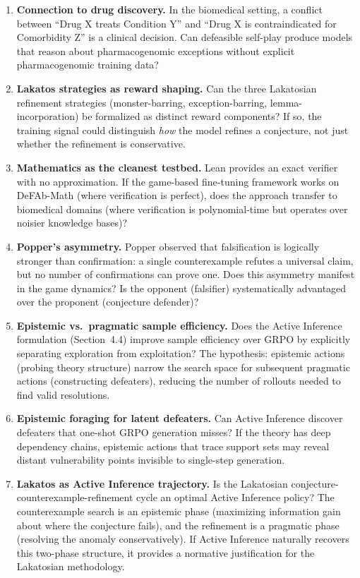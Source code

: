 \documentclass[11pt]{article}
\begin{document}
\begin{enumerate}
    \item \textbf{Connection to drug discovery.} In the biomedical setting, a conflict between ``Drug X treats Condition Y'' and ``Drug X is contraindicated for Comorbidity Z'' is a clinical decision. Can defeasible self-play produce models that reason about pharmacogenomic exceptions without explicit pharmacogenomic training data?
    \item \textbf{Lakatos strategies as reward shaping.} Can the three Lakatosian refinement strategies (monster-barring, exception-barring, lemma-incorporation) be formalized as distinct reward components? If so, the training signal could distinguish \emph{how} the model refines a conjecture, not just whether the refinement is conservative.
    \item \textbf{Mathematics as the cleanest testbed.} Lean provides an exact verifier with no approximation. If the game-based fine-tuning framework works on DeFAb-Math (where verification is perfect), does the approach transfer to biomedical domains (where verification is polynomial-time but operates over noisier knowledge bases)?
    \item \textbf{Popper's asymmetry.} Popper observed that falsification is logically stronger than confirmation: a single counterexample refutes a universal claim, but no number of confirmations can prove one. Does this asymmetry manifest in the game dynamics? Is the opponent (falsifier) systematically advantaged over the proponent (conjecture defender)?
    \item \textbf{Epistemic vs.\ pragmatic sample efficiency.} Does the Active Inference formulation (Section~4.4) improve sample efficiency over GRPO by explicitly separating exploration from exploitation? The hypothesis: epistemic actions (probing theory structure) narrow the search space for subsequent pragmatic actions (constructing defeaters), reducing the number of rollouts needed to find valid resolutions.
    \item \textbf{Epistemic foraging for latent defeaters.} Can Active Inference discover defeaters that one-shot GRPO generation misses? If the theory has deep dependency chains, epistemic actions that trace support sets may reveal distant vulnerability points invisible to single-step generation.
    \item \textbf{Lakatos as Active Inference trajectory.} Is the Lakatosian conjecture-counterexample-refinement cycle an optimal Active Inference policy? The counterexample search is an epistemic phase (maximizing information gain about where the conjecture fails), and the refinement is a pragmatic phase (resolving the anomaly conservatively). If Active Inference naturally recovers this two-phase structure, it provides a normative justification for the Lakatosian methodology.

\end{enumerate}
\end{document}
